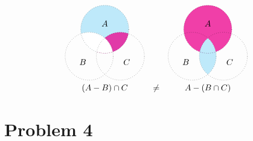 \begin{itemize}
	\[\begin{array}{ccc}
		\begin{tikzpicture}
			\begin{scope}
				\fill[cyan,opacity=.25] \firstcircle;
				\clip \firstcircle;
				\fill[white] \secondcircle;
			\end{scope}
			\begin{scope}
				\clip \firstcircle;
				\fill[magenta,opacity=.75] \thirdcircle;
				\fill[white] \secondcircle;
			\end{scope}
			\draw[dotted] \firstcircle node[text=black,above] {$A$};
			\draw[dotted] \secondcircle node [text=black,below left] {$B$};
			\draw[dotted] \thirdcircle node [text=black,below right] {$C$};
		\end{tikzpicture}
		&&
		\begin{tikzpicture}
			\begin{scope}
				\fill[magenta,opacity=.75] \firstcircle;
				\clip \secondcircle;
			\end{scope}
			\begin{scope}
				\clip \firstcircle;
				\clip \secondcircle;
				\fill[white] \thirdcircle;
			\end{scope}
			\begin{scope}
				\clip \secondcircle;
				\fill[cyan,opacity=.25] \thirdcircle;
			\end{scope}
			\draw[dotted] \firstcircle node[text=black,above] {$A$};
			\draw[dotted] \secondcircle node [text=black,below left] {$B$};
			\draw[dotted] \thirdcircle node [text=black,below right] {$C$};
		\end{tikzpicture}
		\\
		(A - B) \cap C
		&\neq&
		A - (B \cap C)
	\end{array}\]
\end{itemize}

\section*{Problem 4}

